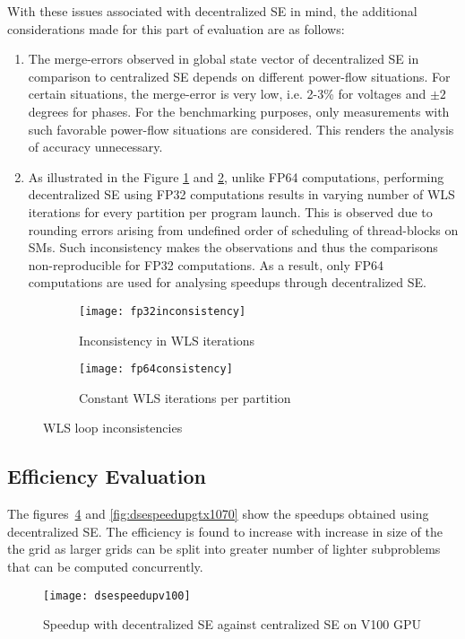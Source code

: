 \documentclass[thesis.tex]{subfiles}
\begin{document}
With these issues associated with decentralized SE in mind, the additional considerations made for this part of evaluation are as follows:
\begin{enumerate}
	\item The merge-errors observed in global state vector of decentralized SE in comparison to centralized SE depends on different power-flow situations. For certain situations, the merge-error is very low, i.e. 2-3\% for voltages and $\pm2$ degrees for phases. For the benchmarking purposes, only measurements with such favorable power-flow situations are considered. This renders the analysis of accuracy unnecessary.
	\item As illustrated in the Figure \ref{fig:fp32inconsistency} and \ref{fig:fp64consistency}, unlike FP64 computations, performing decentralized SE using FP32 computations results in varying number of WLS iterations for every partition per program launch. This is observed due to rounding errors arising from undefined order of scheduling of thread-blocks on SMs. Such inconsistency makes the observations and thus the comparisons non-reproducible for FP32 computations. As a result, only FP64 computations are used for analysing speedups through decentralized SE.
\end{enumerate}

\begin{figure}[H]
	\begin{subfigure}{.5\textwidth}
		\centering
		\texttt{[image: fp32inconsistency]}
		\caption{Inconsistency in WLS iterations}
		\label{fig:fp32inconsistency}
	\end{subfigure}
	\begin{subfigure}{.5\textwidth}
		\centering
		\texttt{[image: fp64consistency]}
		\caption{Constant WLS iterations per partition}
		\label{fig:fp64consistency}
	\end{subfigure}
	\caption{WLS loop inconsistencies}
	\label{fig:mapooldmm}
\end{figure}

\subsection{Efficiency Evaluation}
The figures~\ref{fig:dsespeedupv100} and \ref{fig:dsespeedupgtx1070} show the speedups obtained using decentralized SE. The efficiency is found to increase with increase in size of the the grid as larger grids can be split into greater number of lighter subproblems that can be computed concurrently. 
\begin{figure}[H]
	\centering
	\texttt{[image: dsespeedupv100]}
	\caption{Speedup with decentralized SE against centralized SE on V100 GPU}
	\label{fig:dsespeedupv100}
\end{figure}
\end{document}
